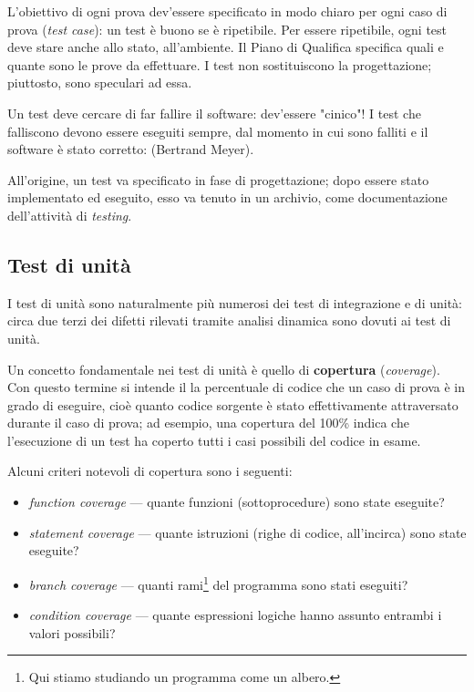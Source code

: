 \documentclass[a4paper]{article}
\begin{document}
		
L'obiettivo di ogni prova dev'essere specificato in modo chiaro per ogni caso di prova (\emph{test case}): un test è buono se è ripetibile. Per essere ripetibile, ogni test deve stare anche allo stato, all'ambiente. Il Piano di Qualifica specifica quali e quante sono le prove da effettuare. I test non sostituiscono la progettazione; piuttosto, sono speculari ad essa.
		
Un test deve cercare di far fallire il software: dev'essere "cinico"! I test che falliscono devono essere eseguiti sempre, dal momento in cui sono falliti e il software è stato corretto:  (Bertrand Meyer).
		
All'origine, un test va specificato in fase di progettazione; dopo essere stato implementato ed eseguito, esso va tenuto in un archivio, come documentazione dell'attività di \emph{testing}.

		
	\subsection{Test di unità}

		
I test di unità sono naturalmente più numerosi dei test di integrazione e di unità: circa due terzi dei difetti rilevati tramite analisi dinamica sono dovuti ai test di unità.
		
Un concetto fondamentale nei test di unità è quello di \textbf{copertura} (\emph{coverage}). Con questo termine si intende il la percentuale di codice che un caso di prova è in grado di eseguire, cioè quanto codice sorgente è stato effettivamente attraversato durante il caso di prova; ad esempio, una copertura del 100\% indica che l'esecuzione di un test ha coperto tutti i casi possibili del codice in esame.
		
Alcuni criteri notevoli di copertura sono i seguenti:
		
	\begin{itemize}
		
			
	\item \emph{function coverage} --- quante funzioni (sottoprocedure) sono state eseguite?
			
	\item \emph{statement coverage} --- quante istruzioni (righe di codice, all'incirca) sono state eseguite?
			
	\item \emph{branch coverage} --- quanti rami\footnote{Qui stiamo studiando un programma come un albero.} del programma sono stati eseguiti?
			
	\item \emph{condition coverage} --- quante espressioni logiche hanno assunto entrambi i valori possibili?
		
	\end{itemize}
\end{document}
